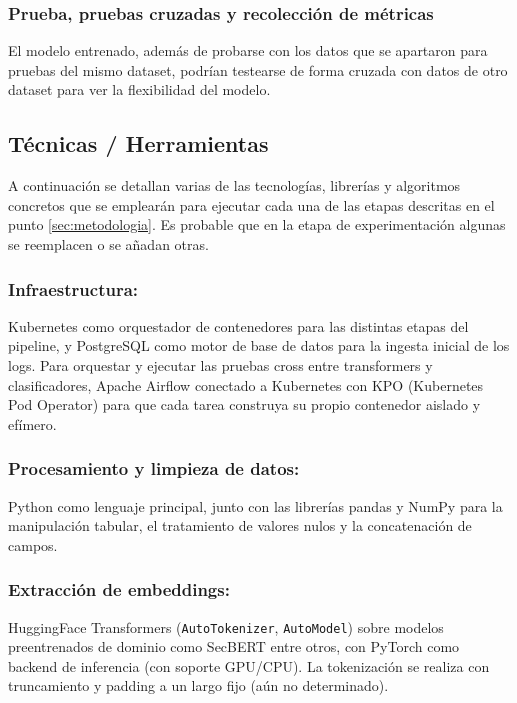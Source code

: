 \documentclass[12pt, a4paper]{article}
\begin{document}
\subsubsection{Prueba, pruebas cruzadas y recolección de métricas}
El modelo entrenado, además de probarse con los datos que se apartaron para pruebas del mismo dataset, podrían testearse  de forma cruzada con datos de otro dataset para ver la flexibilidad del modelo.

\subsection{Técnicas / Herramientas}

A continuación se detallan varias de las tecnologías, librerías y algoritmos concretos que se emplearán para ejecutar cada una de las etapas descritas en el punto \ref{sec:metodologia}. Es probable que en la etapa de experimentación algunas se reemplacen o se añadan otras.

\subsubsection{Infraestructura:} Kubernetes como orquestador de contenedores para las distintas etapas del pipeline, y PostgreSQL como motor de base de datos para la ingesta inicial de los logs. Para orquestar y ejecutar las pruebas cross entre transformers y clasificadores, Apache Airflow conectado a Kubernetes con KPO (Kubernetes Pod Operator) para que cada tarea construya su propio contenedor aislado y efímero.

\subsubsection{Procesamiento y limpieza de datos:} Python como lenguaje principal, junto con las librerías pandas y NumPy para la manipulación tabular, el tratamiento de valores nulos y la concatenación de campos.

\subsubsection{Extracción de embeddings:} HuggingFace Transformers (\texttt{AutoTokenizer}, \texttt{AutoModel}) sobre modelos preentrenados de dominio como SecBERT \cite{jackaduma2022secbert} entre otros, con PyTorch \cite{paszke2019pytorch} como backend de inferencia (con soporte GPU/CPU). La tokenización se realiza con truncamiento y padding a un largo fijo (aún no determinado).
\end{document}
